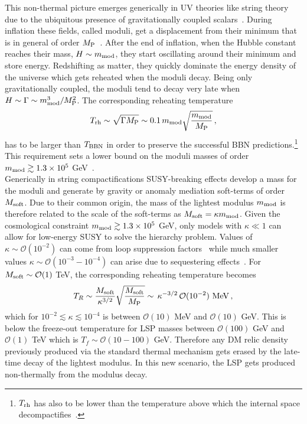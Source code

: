 \documentclass[12pt,a4paper]{book}
\newcommand{\mc}{\mathcal}
\begin{document}
This non-thermal picture emerges generically in UV theories like string theory due to the ubiquitous presence of gravitationally coupled scalars~\cite{Coughlan:1983ci, Banks:1993en, deCarlos:1993wie, Acharya:2008bk, Acharya:2009zt, Acharya:2010af, Allahverdi:2013noa}. During inflation these fields, called moduli, get a displacement from their minimum that is in general of order $M_{\rm P}$~\cite{Dine:1995kz}. After the end of inflation, when the Hubble constant reaches their mass, $H\sim m_{\rm mod}$, they start oscillating around their minimum and store energy. Redshifting as matter, they quickly dominate the energy density of the universe which gets reheated when the moduli decay. Being only gravitationally coupled, the moduli tend to decay very late when $H\sim \Gamma \sim m_{\rm mod}^3/M_{\rm P}^2$. The corresponding reheating temperature
\begin{align}
T_{\rm rh} \sim \sqrt{\Gamma M_{\rm P}}\sim 0.1 \,m_{\rm mod} \sqrt{\frac{m_{\rm mod}}{M_{\rm P}}}\,,
\end{align}
has to be larger than $T_{\rm BBN}$ in order to preserve the successful BBN predictions.\footnote{$T_{\rm rh}$ has also to be lower than the temperature above which the internal space decompactifies~\cite{Buchmuller:2004tz, Anguelova:2009ht}.} This requirement sets a lower bound on the moduli masses of order $m_{\rm mod}\gtrsim 1.3 \times 10^5$ GeV~\cite{Coughlan:1983ci, Banks:1993en, deCarlos:1993wie}.\\

Generically in string compactifications SUSY-breaking effects develop a mass for the moduli and generate by gravity or anomaly mediation soft-terms of order $M_{\rm soft}$. Due to their common origin, the mass of the lightest modulus $m_{\rm mod}$ is therefore related to the scale of the soft-terms as $M_{\rm soft} = \kappa m_{\rm mod}$. Given the cosmological constraint $m_{\rm mod}\gtrsim 1.3 \times 10^5$ GeV, only models with $\kappa\ll 1$ can allow for low-energy SUSY to solve the hierarchy problem. Values of $\kappa\sim\mc{O}(10^{-2})$ can come from loop suppression factors~\cite{Choi:2005ge, Lowen:2008fm, Acharya:2008zi,Dudas:2012wi} while much smaller values $\kappa\sim\mc{O}(10^{-3}-10^{-4})$ can arise due to sequestering effects~\cite{Aparicio:2014wxa, Blumenhagen:2009gk}. For $M_{\rm soft}\sim \mc{O}(1)$ TeV, the corresponding reheating temperature becomes
\begin{align}
T_R \sim  \frac{M_{\rm soft}}{\kappa^{3/2}} \sqrt{\frac{M_{\rm soft}}{M_{\rm P}}} \sim \,\kappa^{-3/2}\,\mc{O}(10^{-2})\,\,{\rm MeV}\,,
\end{align}
which for $10^{-2}\lesssim\kappa\lesssim 10^{-4}$ is between $\mc{O}(10)$ MeV and $\mc{O}(10)$ GeV. This is below the freeze-out temperature for LSP masses between $\mc{O}(100)$ GeV and $\mc{O}(1)$ TeV which is
$T_f \sim \mc{O}(10-100)$ GeV. Therefore any DM relic density previously produced via the standard thermal mechanism gets erased by the late-time decay of the lightest modulus. In this new scenario, the LSP gets produced non-thermally from the modulus decay.\\
\end{document}
